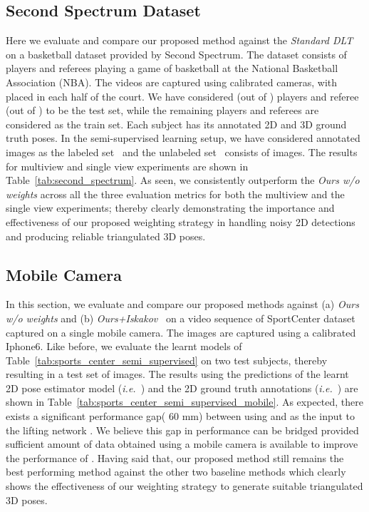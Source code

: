 \documentclass[runningheads]{llncs}
\def\ie{\emph{i.e.}}
\begin{document}
\subsection{Second Spectrum Dataset}
Here we evaluate and compare our proposed method against the \emph{Standard DLT} on a basketball dataset provided by Second Spectrum. The dataset consists of  players and  referees playing a game of basketball at the National Basketball Association (NBA). The videos are captured using  calibrated cameras, with  placed in each half of the court. We have considered  (out of ) players and  referee (out of ) to be the test set, while the remaining  players and  referees are considered as the train set. Each subject has its annotated 2D and 3D ground truth poses. In the semi-supervised learning setup, we have considered  annotated images as the labeled set~ and the unlabeled set~ consists of  images. The results for multiview and single view experiments are shown in Table~\ref{tab:second_spectrum}. As seen, we consistently outperform the \emph{Ours w/o weights} across all the three evaluation metrics for both the multiview and the single view experiments; thereby clearly demonstrating the importance and effectiveness of our proposed weighting strategy in handling noisy 2D detections and producing reliable triangulated 3D poses.



\subsection{Mobile Camera}
In this section, we evaluate and compare our proposed methods against (a) \emph{Ours w/o weights} and
(b) {\it Ours+Iskakov}~\cite{Iskakov19} on a video sequence of SportCenter dataset captured on a single mobile camera. The images are captured using a calibrated Iphone6. Like before, we evaluate the learnt models of Table~\ref{tab:sports_center_semi_supervised} on two test subjects, thereby resulting in a test set of  images. The results using the predictions of the learnt 2D pose estimator model  (\ie~) and the 2D ground truth annotations (\ie~) are shown in Table~\ref{tab:sports_center_semi_supervised_mobile}. As expected, there exists a significant performance gap( 60 mm) between using  and  as the input to the lifting network . We believe this gap in performance can be bridged provided sufficient amount of data obtained using a mobile camera is available to improve the performance of . Having said that, our proposed method still remains the best performing method against the other two baseline methods which clearly shows the effectiveness of our weighting strategy to generate suitable triangulated 3D poses.
\end{document}
